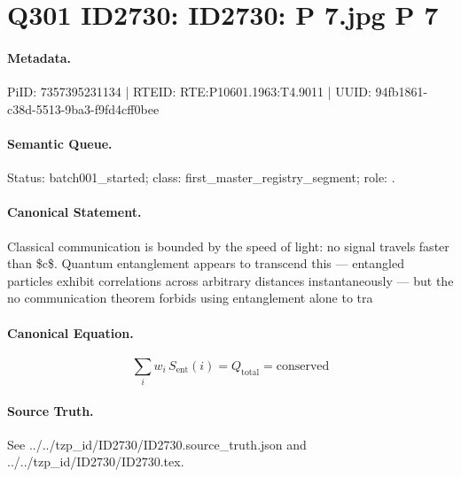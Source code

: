 \section*{Q301 ID2730: ID2730: P 7.jpg P 7}
\paragraph{Metadata.}
PiID: 7357395231134 | RTEID: RTE:P10601.1963:T4.9011 | UUID: 94fb1861-c38d-5513-9ba3-f9fd4cff0bee

\paragraph{Semantic Queue.}
Status: batch001\_started; class: first\_master\_registry\_segment; role: .

\paragraph{Canonical Statement.}
Classical communication is bounded by the speed of light: no signal travels faster than \$c\$. Quantum entanglement appears to transcend this — entangled particles exhibit correlations across arbitrary distances instantaneously — but the no communication theorem forbids using entanglement alone to tra

\paragraph{Canonical Equation.}
\[
\sum_i w_i\, S_\text{ent}(i) = Q_\text{total} = \text{conserved}
\]

\paragraph{Source Truth.}
See ../../tzp\_id/ID2730/ID2730.source\_truth.json and ../../tzp\_id/ID2730/ID2730.tex.
